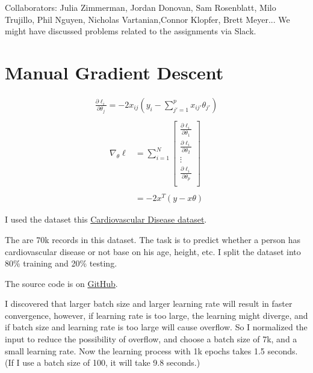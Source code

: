 \newcommand\chapternumber{3}

\usepackage{enumerate}
\usepackage{float}


Collaborators: Julia Zimmerman, Jordan Donovan, Sam Rosenblatt, Milo Trujillo, Phil Nguyen, Nicholas Vartanian,Connor Klopfer, Brett Meyer...
We might have discussed problems related to the assignments via Slack.
\section{Manual Gradient Descent}
\begin{align*}
    \frac{\partial \ell_i}{\partial \theta_j} = -2 x_{ij} (y_i - \sum_{j'=1}^{p} x_{ij'} \theta_{j'}) \\
\end{align*}
\begin{align*}
    \nabla_{\theta} \ell & = \sum_{i=1}^{N} \begin{bmatrix}
        \frac{\partial \ell_i}{\partial \theta_1} \\
        \frac{\partial \ell_i}{\partial \theta_2} \\
        \vdots                                    \\
        \frac{\partial \ell_i}{\partial \theta_p} \\
    \end{bmatrix} \\\\
                         & = -2 x^T (y-x\theta)
\end{align*}

I used the dataset this \href{https://www.kaggle.com/sulianova/cardiovascular-disease-dataset}{Cardiovascular Disease dataset}.

The are 70k records in this dataset.
The task is to predict whether a person has cardiovascular disease or not base on his age, height, etc.
I split the dataset into 80\% training and 20\% testing.

The source code is on \href{https://github.com/liusida/ds2/blob/main/assignment3/code/q1.py}{GitHub}.

I discovered that larger batch size and larger learning rate will result in faster convergence,
however, if learning rate is too large, the learning might diverge,
and if batch size and learning rate is too large will cause overflow.
So I normalized the input to reduce the possibility of overflow, and choose a batch size of 7k, and a small learning rate.
Now the learning process with 1k epochs takes 1.5 seconds. (If I use a batch size of 100, it will take 9.8 seconds.)


